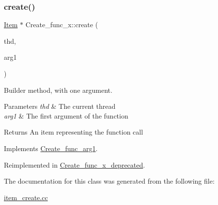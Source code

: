 \subsubsection{\texorpdfstring{create()}{create()}}
{\footnotesize\ttfamily \mbox{\hyperlink{classItem}{Item}} $\ast$ Create\+\_\+func\+\_\+x\+::create (\begin{DoxyParamCaption}\item[{T\+HD $\ast$}]{thd,  }\item[{\mbox{\hyperlink{classItem}{Item}} $\ast$}]{arg1 }\end{DoxyParamCaption})\hspace{0.3cm}{\ttfamily [virtual]}}

Builder method, with one argument. 
\begin{DoxyParams}{Parameters}
{\em thd} & The current thread \\
\hline
{\em arg1} & The first argument of the function \\
\hline
\end{DoxyParams}
\begin{DoxyReturn}{Returns}
An item representing the function call 
\end{DoxyReturn}


Implements \mbox{\hyperlink{classCreate__func__arg1_a3e9a98f755cd82c3e762e334c955a8c9}{Create\+\_\+func\+\_\+arg1}}.



Reimplemented in \mbox{\hyperlink{classCreate__func__x__deprecated_a462bc6798ecac85b5820b0d13b998507}{Create\+\_\+func\+\_\+x\+\_\+deprecated}}.



The documentation for this class was generated from the following file\+:\begin{DoxyCompactItemize}
\item 
\mbox{\hyperlink{item__create_8cc}{item\+\_\+create.\+cc}}\end{DoxyCompactItemize}
